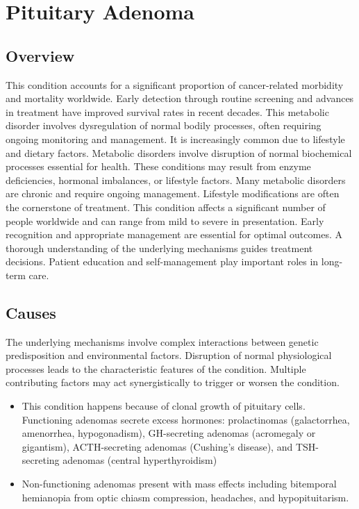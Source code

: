 \chapter{Pituitary Adenoma}
\label{sec:Pituitary Adenoma}

\section{Overview}
This condition accounts for a significant proportion of cancer-related morbidity and mortality worldwide. Early detection through routine screening and advances in treatment have improved survival rates in recent decades. This metabolic disorder involves dysregulation of normal bodily processes, often requiring ongoing monitoring and management. It is increasingly common due to lifestyle and dietary factors. Metabolic disorders involve disruption of normal biochemical processes essential for health. These conditions may result from enzyme deficiencies, hormonal imbalances, or lifestyle factors. Many metabolic disorders are chronic and require ongoing management. Lifestyle modifications are often the cornerstone of treatment. This condition affects a significant number of people worldwide and can range from mild to severe in presentation. Early recognition and appropriate management are essential for optimal outcomes. A thorough understanding of the underlying mechanisms guides treatment decisions. Patient education and self-management play important roles in long-term care.
\section{Causes}
The underlying mechanisms involve complex interactions between genetic predisposition and environmental factors. Disruption of normal physiological processes leads to the characteristic features of the condition. Multiple contributing factors may act synergistically to trigger or worsen the condition.

\begin{itemize}[noitemsep]
  \item This condition happens because of clonal growth of pituitary cells. Functioning adenomas secrete excess hormones: prolactinomas (galactorrhea, amenorrhea, hypogonadism), GH-secreting adenomas (acromegaly or gigantism), ACTH-secreting adenomas (Cushing's disease), and TSH-secreting adenomas (central hyperthyroidism)
  \item Non-functioning adenomas present with mass effects including bitemporal hemianopia from optic chiasm compression, headaches, and hypopituitarism.
\end{itemize}
